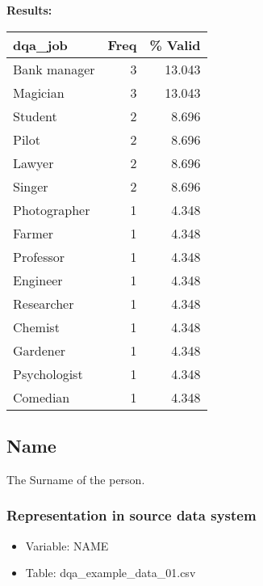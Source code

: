 \documentclass[
]{article}
\providecommand{\tightlist}{%
  \setlength{\itemsep}{0pt}\setlength{\parskip}{0pt}}
\begin{document}
\textbf{Results:}\\

\begin{table}[H]
\centering
\begin{tabular}{l|r|r}
\hline
\textbf{dqa\_job} & \textbf{Freq} & \textbf{\% Valid}\\
\hline
Bank manager & 3 & 13.043\\
\hline
Magician & 3 & 13.043\\
\hline
Student & 2 & 8.696\\
\hline
Pilot & 2 & 8.696\\
\hline
Lawyer & 2 & 8.696\\
\hline
Singer & 2 & 8.696\\
\hline
Photographer & 1 & 4.348\\
\hline
Farmer & 1 & 4.348\\
\hline
Professor & 1 & 4.348\\
\hline
Engineer & 1 & 4.348\\
\hline
Researcher & 1 & 4.348\\
\hline
Chemist & 1 & 4.348\\
\hline
Gardener & 1 & 4.348\\
\hline
Psychologist & 1 & 4.348\\
\hline
Comedian & 1 & 4.348\\
\hline
\end{tabular}
\end{table}
\newpage

\hypertarget{name}{%
\subsection{Name}\label{name}}

The Surname of the person.

\hypertarget{representation-in-source-data-system-9}{%
\subsubsection{\texorpdfstring{Representation in \textbf{source} data
system}{Representation in source data system}}\label{representation-in-source-data-system-9}}

\begin{itemize}
\tightlist
\item
  Variable: NAME
\item
  Table: dqa\_example\_data\_01.csv
\end{itemize}
\end{document}
